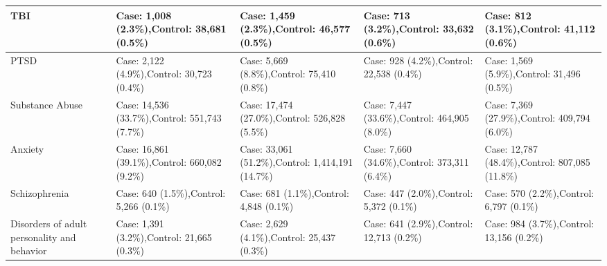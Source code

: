 \documentclass[12pt]{article}
\begin{document}
\begin{table}[!ht]
\begin{tabular}{
  |L{0.81in}|L{1.41in}|L{1.41in}|L{1.41in}|L{1.41in}|
}
TBI &
Case: 1,008 (2.3\%),\newline Control: 38,681 (0.5\%) &
Case: 1,459 (2.3\%),\newline Control: 46,577 (0.5\%) &
Case: 713 (3.2\%),\newline Control: 33,632 (0.6\%) &
Case: 812 (3.1\%),\newline Control: 41,112 (0.6\%) \\
\hline

PTSD &
Case: 2,122 (4.9\%),\newline Control: 30,723 (0.4\%) &
Case: 5,669 (8.8\%),\newline Control: 75,410 (0.8\%) &
Case: 928 (4.2\%),\newline Control: 22,538 (0.4\%) &
Case: 1,569 (5.9\%),\newline Control: 31,496 (0.5\%) \\
\hline

Substance Abuse &
Case: 14,536 (33.7\%),\newline Control: 551,743 (7.7\%) &
Case: 17,474 (27.0\%),\newline Control: 526,828 (5.5\%) &
Case: 7,447 (33.6\%),\newline Control: 464,905 (8.0\%) &
Case: 7,369 (27.9\%),\newline Control: 409,794 (6.0\%) \\
\hline

Anxiety &
Case: 16,861 (39.1\%),\newline Control: 660,082 (9.2\%) &
Case: 33,061 (51.2\%),\newline Control: 1,414,191 (14.7\%) &
Case: 7,660 (34.6\%),\newline Control: 373,311 (6.4\%) &
Case: 12,787 (48.4\%),\newline Control: 807,085 (11.8\%) \\
\hline

Schizophrenia &
Case: 640 (1.5\%),\newline Control: 5,266 (0.1\%) &
Case: 681 (1.1\%),\newline Control: 4,848 (0.1\%) &
Case: 447 (2.0\%),\newline Control: 5,372 (0.1\%) &
Case: 570 (2.2\%),\newline Control: 6,797 (0.1\%) \\
\hline

Disorders of adult personality and behavior &
Case: 1,391 (3.2\%),\newline Control: 21,665 (0.3\%) &
Case: 2,629 (4.1\%),\newline Control: 25,437 (0.3\%) &
Case: 641 (2.9\%),\newline Control: 12,713 (0.2\%) &
Case: 984 (3.7\%),\newline Control: 13,156 (0.2\%) \\
\hline


\end{tabular}
\end{table}
\end{document}
